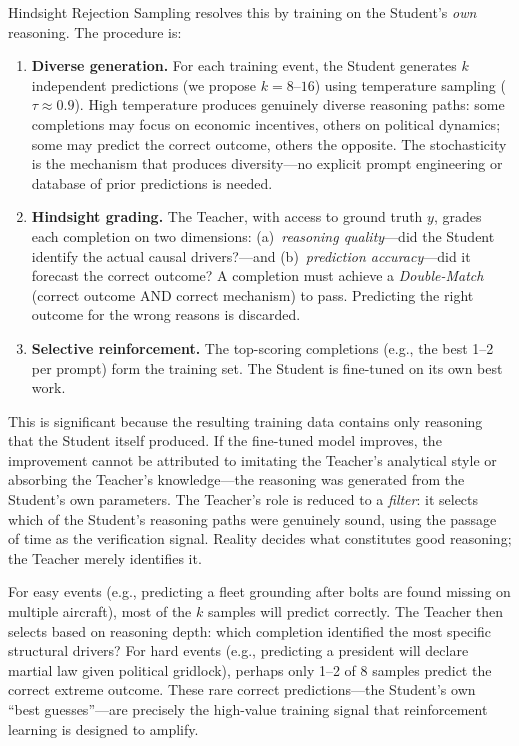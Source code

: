 \documentclass[11pt,a4paper]{article}
\begin{document}
Hindsight Rejection Sampling resolves this by training on the Student's \textit{own} reasoning. The procedure is:

\begin{enumerate}
    \item \textbf{Diverse generation.} For each training event, the Student generates $k$ independent predictions (we propose $k=8$--$16$) using temperature sampling ($\tau \approx 0.9$). High temperature produces genuinely diverse reasoning paths: some completions may focus on economic incentives, others on political dynamics; some may predict the correct outcome, others the opposite. The stochasticity is the mechanism that produces diversity---no explicit prompt engineering or database of prior predictions is needed.

    \item \textbf{Hindsight grading.} The Teacher, with access to ground truth $y$, grades each completion on two dimensions: (a)~\textit{reasoning quality}---did the Student identify the actual causal drivers?---and (b)~\textit{prediction accuracy}---did it forecast the correct outcome? A completion must achieve a \textit{Double-Match} (correct outcome AND correct mechanism) to pass. Predicting the right outcome for the wrong reasons is discarded.

    \item \textbf{Selective reinforcement.} The top-scoring completions (e.g., the best 1--2 per prompt) form the training set. The Student is fine-tuned on its own best work.
\end{enumerate}

This is significant because the resulting training data contains only reasoning that the Student itself produced. If the fine-tuned model improves, the improvement cannot be attributed to imitating the Teacher's analytical style or absorbing the Teacher's knowledge---the reasoning was generated from the Student's own parameters. The Teacher's role is reduced to a \textit{filter}: it selects which of the Student's reasoning paths were genuinely sound, using the passage of time as the verification signal. Reality decides what constitutes good reasoning; the Teacher merely identifies it.

For easy events (e.g., predicting a fleet grounding after bolts are found missing on multiple aircraft), most of the $k$ samples will predict correctly. The Teacher then selects based on reasoning depth: which completion identified the most specific structural drivers? For hard events (e.g., predicting a president will declare martial law given political gridlock), perhaps only 1--2 of 8 samples predict the correct extreme outcome. These rare correct predictions---the Student's own ``best guesses''---are precisely the high-value training signal that reinforcement learning is designed to amplify.
\end{document}

